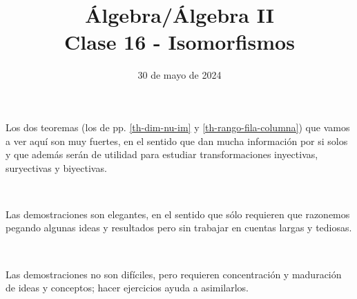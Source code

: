 \documentclass[handout]{beamer} %
\title[Clase 16 - Isomorfismos]{Álgebra/Álgebra II \\ Clase 16 - Isomorfismos}
\author[]{}
\institute[]{\normalsize FAMAF / UNC
	\\[\baselineskip] ${}^{}$
	\\[\baselineskip]
}
\date[30/05/20204]{30 de mayo de 2024}
\newcommand{\im}{\operatorname{Im}}
\renewcommand\nu{\operatorname{Nu}}
\begin{document}
\begin{frame}
\maketitle
\end{frame}




\begin{frame}
Los dos teoremas (los de pp. \ref{th-dim-nu-im} y \ref{th-rango-fila-columna}) que vamos a ver aquí son muy fuertes, en el sentido que dan mucha información por si solos y que además serán de utilidad para estudiar transformaciones inyectivas, suryectivas y biyectivas.
\pause

\

Las demostraciones son elegantes, en el sentido que sólo requieren que razonemos pegando algunas ideas y resultados pero sin trabajar en cuentas largas y tediosas.
\pause

\

Las demostraciones no son difíciles, pero requieren concentración y maduración de ideas y conceptos; hacer ejercicios ayuda a asimilarlos.
\pause
\


\end{frame}


\end{document}
